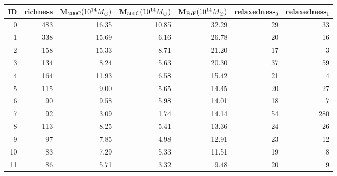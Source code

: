 \begin{tabular}{rrrrrrr}
\toprule
ID & richness & M$_{\rm 200C} (10^{14} M_\odot)$ & M$_{\rm 500C} (10^{14} M_\odot)$ & M$_{\rm FoF} (10^{14} M_\odot)$  & relaxedness$_0$ & relaxedness$_1$ \\
\midrule
 0 &      483 &                            16.35 &                            10.85 &                            32.29 &              29 &              33 \\
 1 &      338 &                            15.69 &                             6.16 &                            26.78 &              20 &              16 \\
 2 &      158 &                            15.33 &                             8.71 &                            21.20 &              17 &               3 \\
 3 &      134 &                             8.24 &                             5.63 &                            20.30 &              37 &              59 \\
 4 &      164 &                            11.93 &                             6.58 &                            15.42 &              21 &               4 \\
 5 &      115 &                             9.00 &                             5.65 &                            14.45 &              20 &              27 \\
 6 &       90 &                             9.58 &                             5.98 &                            14.01 &              18 &               7 \\
 7 &       92 &                             3.09 &                             1.74 &                            14.14 &              54 &             280 \\
 8 &      113 &                             8.25 &                             5.41 &                            13.36 &              24 &              26 \\
 9 &       97 &                             7.85 &                             4.98 &                            12.91 &              23 &              12 \\
10 &       83 &                             7.29 &                             5.33 &                            11.51 &              19 &               8 \\
11 &       86 &                             5.71 &                             3.32 &                             9.48 &              20 &               9 \\

\end{tabular}
